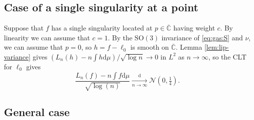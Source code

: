 \documentclass[10pt,reqno]{amsart}
\numberwithin{equation}{section}
\numberwithin{figure}{section}
\theoremstyle{plain}
\newcommand{\<}{\langle}
\renewcommand{\>}{\rangle}
\begin{document}
\subsection{Case of a single singularity at a point} 

Suppose that $f$ has a single singularity located at $p \in \overline{\mathbb C}$ having weight $c$. By linearity we can assume that $c=1$. By the $\mathrm{SO}(3)$ invariance of \eqref{eq:gas:S} and $\nu$, we can assume that $p=0$, so $h=f-\ell_0$ is smooth on $\overline{\mathbb C}$.
Lemma \ref{lem:lip-variance} gives $(L_n(h)-n\int h\mathrm{d}\mu)/\sqrt{\log n}\to0$ in $L^2$ as $n\to\infty$, so the CLT for $\ell_0$ gives
\begin{equation}
    \frac{L_n(f)-n\int f\mathrm{d}\mu}{\sqrt{\log(n)}}
    \xrightarrow[n\to\infty]{\mathrm{d}}
    \mathcal{N}(0,\tfrac{1}{4}).
\end{equation}

\subsection{General case} 
\end{document}

